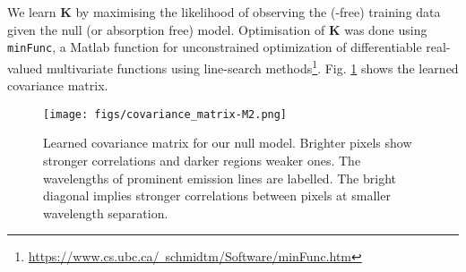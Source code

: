 \documentclass[fleqn,usenatbib]{mnras}
\newcommand{\civ}{\ion{C}{IV}}
\begin{document}
We learn $\mathbf{K}$ by maximising the likelihood of observing the (\civ-free) training data given the null (or absorption free) model.
Optimisation of $\mathbf{K}$ was done using \texttt{minFunc}, a Matlab function for unconstrained optimization of differentiable real-valued multivariate functions using line-search methods\footnote{\href{https://www.cs.ubc.ca/~schmidtm/Software/minFunc.html}{https://www.cs.ubc.ca/~schmidtm/Software/minFunc.htm}}.
Fig. \ref{fig:K} shows the learned covariance matrix.
\begin{figure}
  \texttt{[image: figs/covariance\_matrix-M2.png]}
  \caption{Learned covariance matrix for our null model. Brighter pixels show stronger correlations and darker regions weaker ones. The wavelengths of prominent emission lines are labelled. The bright diagonal implies stronger correlations between pixels at smaller wavelength separation.}
  \label{fig:K}
\end{figure}
\end{document}
